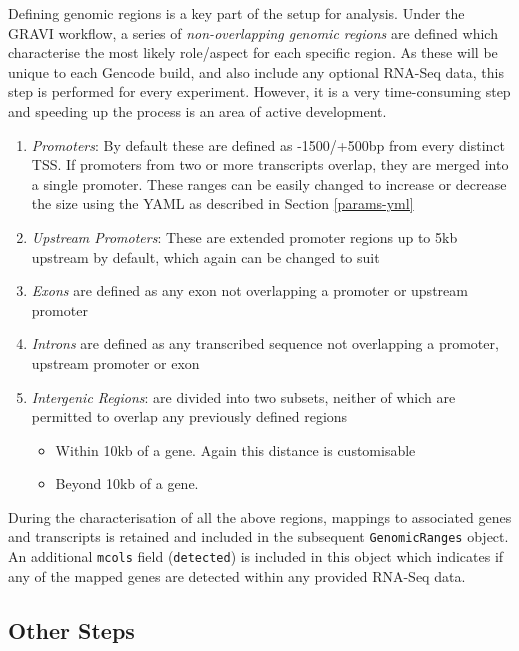 \documentclass[
]{book}
\providecommand{\tightlist}{%
  \setlength{\itemsep}{0pt}\setlength{\parskip}{0pt}}
\begin{document}
Defining genomic regions is a key part of the setup for analysis.
Under the GRAVI workflow, a series of \emph{non-overlapping genomic regions} are defined which characterise the most likely role/aspect for each specific region.
As these will be unique to each Gencode build, and also include any optional RNA-Seq data, this step is performed for every experiment.
However, it is a very time-consuming step and speeding up the process is an area of active development.

\begin{enumerate}
\def\labelenumi{\arabic{enumi}.}
\tightlist
\item
  \emph{Promoters}: By default these are defined as -1500/+500bp from every distinct TSS.
  If promoters from two or more transcripts overlap, they are merged into a single promoter.
  These ranges can be easily changed to increase or decrease the size using the YAML as described in Section \ref{params-yml}
\item
  \emph{Upstream Promoters}: These are extended promoter regions up to 5kb upstream by default, which again can be changed to suit
\item
  \emph{Exons} are defined as any exon not overlapping a promoter or upstream promoter
\item
  \emph{Introns} are defined as any transcribed sequence not overlapping a promoter, upstream promoter or exon
\item
  \emph{Intergenic Regions}: are divided into two subsets, neither of which are permitted to overlap any previously defined regions

  \begin{itemize}
  \tightlist
  \item
    Within 10kb of a gene. Again this distance is customisable
  \item
    Beyond 10kb of a gene.
  \end{itemize}
\end{enumerate}

During the characterisation of all the above regions, mappings to associated genes and transcripts is retained and included in the subsequent \texttt{GenomicRanges} object.
An additional \texttt{mcols} field (\texttt{detected}) is included in this object which indicates if any of the mapped genes are detected within any provided RNA-Seq data.

\hypertarget{other-steps}{%
\subsection*{Other Steps}\label{other-steps}}
\end{document}

